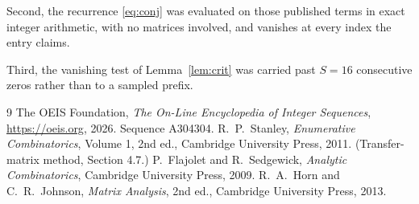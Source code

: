 \documentclass[11pt,a4paper]{article}
\theoremstyle{plain}
\theoremstyle{definition}
\begin{document}
Second, the recurrence \eqref{eq:conj} was evaluated on those published terms in exact
integer arithmetic, with no matrices involved, and vanishes at every index the entry claims.

Third, the vanishing test of Lemma~\ref{lem:crit} was carried past $S=16$ consecutive
zeros rather than to a sampled prefix.

\begin{thebibliography}{9}
 The OEIS Foundation, \emph{The On-Line Encyclopedia of Integer
Sequences}, \url{https://oeis.org}, 2026. Sequence A304304.
 R.~P.~Stanley, \emph{Enumerative Combinatorics}, Volume 1, 2nd ed.,
Cambridge University Press, 2011. (Transfer-matrix method, Section 4.7.)
 P.~Flajolet and R.~Sedgewick, \emph{Analytic Combinatorics}, Cambridge
University Press, 2009.
 R.~A.~Horn and C.~R.~Johnson, \emph{Matrix Analysis}, 2nd ed., Cambridge
University Press, 2013.
\end{thebibliography}
\end{document}
